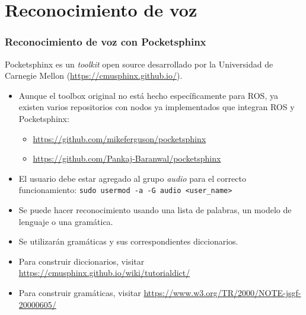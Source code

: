 \documentclass[10pt,spanish,aspectratio=1610]{beamer}
\begin{document}
\section{Reconocimiento de voz}
\begin{frame}\frametitle{Reconocimiento de voz con Pocketsphinx}
  Pocketsphinx es un \textit{toolkit} open source desarrollado por la Universidad de Carnegie Mellon (\url{https://cmusphinx.github.io/}).
  \begin{itemize}
  \item Aunque el toolbox original no está hecho específicamente para ROS, ya existen varios repositorios con nodos ya implementados que integran ROS y Pocketsphinx:
    \begin{itemize}
    \item \url{https://github.com/mikeferguson/pocketsphinx}
    \item \url{https://github.com/Pankaj-Baranwal/pocketsphinx}
    \end{itemize}
  \item El usuario debe estar agregado al grupo \textit{audio} para el correcto funcionamiento: \texttt{sudo usermod -a -G audio <user\_name>}
  \end{itemize}
  \begin{itemize}
  \item Se puede hacer reconocimiento usando una lista de palabras, un modelo de lenguaje o una gramática.
  \item Se utilizarán gramáticas y sus correspondientes diccionarios.
  \item Para construir diccionarios, visitar \url{https://cmusphinx.github.io/wiki/tutorialdict/}
  \item Para construir gramáticas, visitar \url{https://www.w3.org/TR/2000/NOTE-jsgf-20000605/}
  \end{itemize}
\end{frame}
\end{document}

